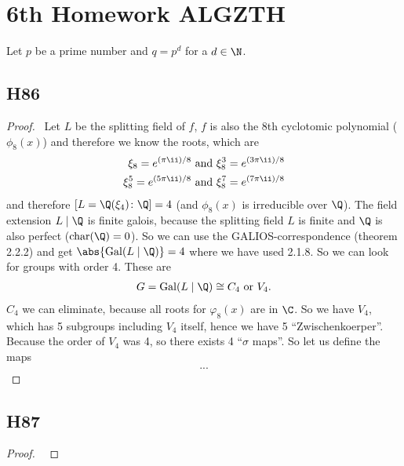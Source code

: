 
\section{6th Homework ALGZTH}
Let $p$ be a prime number and $q=p^d$ for a $d \in \N$.
\subsection{H86}
\begin{proof}\
	Let $L$ be the splitting field of $f$, $f$ is also the 8th cyclotomic polynomial ($\phi_8(x)$) and therefore we know the roots, which are
	\begin{align*}
		\xi_8 = e^{(\pi \ii)/8} \and 
		\xi^3_8 = e^{(3\pi \ii)/8}\\
		\xi_8^5 = e^{(5\pi \ii)/8} \and
		\xi_8^7 = e^{(7\pi \ii)/8}
	\end{align*}
	and therefore $[L=\Q(\xi_4)\colon \Q] = 4$ (and $\phi_8(x)$ is irreducible over $\Q$). The field extension $L \mid \Q$ is finite galois, because the splitting field $L$ is finite and $\Q$ is also perfect ($\chara(\Q) = 0$). So we can use the GALIOS-correspondence (theorem 2.2.2) and get $\abs{\Gal(L\mid \Q)} = 4$ where we have used 2.1.8. So we can look for groups with order 4. These are
	\begin{align*}
		G = \Gal(L \mid \Q) \cong C_4 \text{ or } V_4.
	\end{align*}
	$C_4$ we can eliminate, because all roots for $\varphi_8(x)$ are in $\C$. So we have $V_4$, which has 5 subgroups including $V_4$ itself, hence we have 5 ``Zwischenkoerper''. %
	Because the order of $V_4$ was 4, so there exists 4 ``$\sigma$ maps''. So let us define the maps
	\begin{align*}
		...
	\end{align*}
\end{proof}

\subsection{H87}
\begin{proof}\
	
\end{proof}

